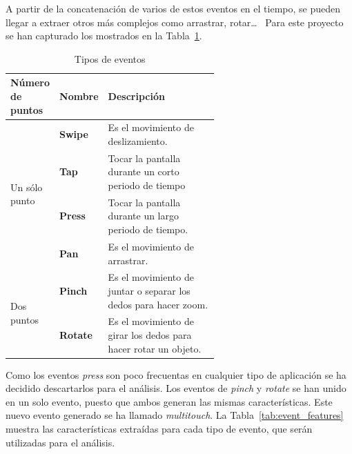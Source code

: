 A partir de la concatenación de varios de estos eventos en el tiempo, se pueden llegar a extraer otros más complejos como arrastrar, rotar\dots~ Para este proyecto se han capturado los mostrados en la Tabla~\ref{tab:event_type}.

\begin{table}[!h]
    \centering
    \begin{tabular}{l l p{0.6\linewidth}}
    \toprule
    Número de puntos & Nombre & Descripción \\
    \midrule
\multirow{4}{*}{Un sólo punto} & \textbf{Swipe} &   Es el movimiento de deslizamiento. \\
                                  & \textbf{Tap} &  Tocar la pantalla durante un corto periodo de tiempo \\
                                  & \textbf{Press} &  Tocar la pantalla durante un largo periodo de tiempo. \\
                                  & \textbf{Pan} &  Es el movimiento de arrastrar. \\
\midrule
\multirow{2}{*}{Dos puntos}  & \textbf{Pinch} &  Es el movimiento de juntar o separar los dedos para hacer zoom. \\
                                & \textbf{Rotate} &  Es el movimiento de girar los dedos para hacer rotar un objeto. \\
    \bottomrule
    \end{tabular}
    \caption{Tipos de eventos}
    \label{tab:event_type}
\end{table}

Como los eventos \textit{press} son poco frecuentas en cualquier tipo de aplicación se ha decidido descartarlos para el análisis.  Los eventos de \textit{pinch} y \textit{rotate} se han unido en un solo evento, puesto que ambos generan las mismas características. Este nuevo evento generado se ha llamado \textit{multitouch}.
La Tabla~\ref{tab:event_features} muestra las características extraídas para cada tipo de evento, que serán utilizadas para el análisis.


